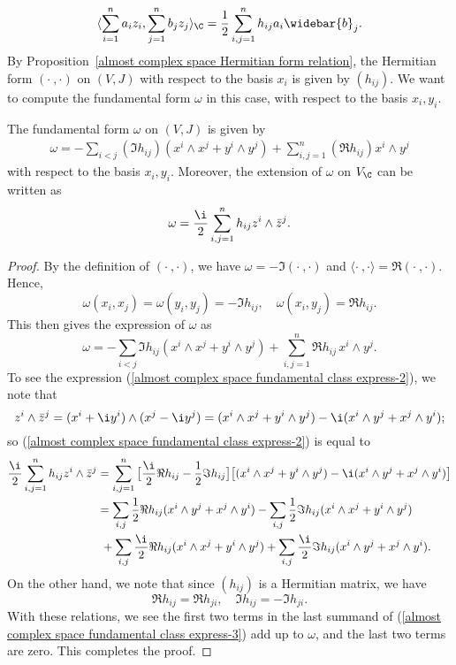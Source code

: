 \[\langle\sum_{i=1}^{n}a_iz_i,\sum_{j=1}^{n}b_jz_j\rangle_{\C}=\frac{1}{2}\sum_{i,j=1}^{n}h_{ij}a_i\widebar{b}_j.\]
By Proposition~\ref{almost complex space Hermitian form relation}, the Hermitian form $(\cdot\ ,\cdot)$ on $(V,J)$ with respect to the basis $x_i$ is given by $(h_{ij})$. We want to compute the fundamental form $\omega$ in this case, with respect to the basis $x_i,y_i$.
\begin{proposition}\label{almost complex space fundamental class express}
The fundamental form $\omega$ on $(V,J)$ is given by
\begin{align}\label{almost complex space fundamental class express-1}
\omega=-\sum_{i<j}(\Im h_{ij})(x^i\wedge x^j+y^i\wedge y^j)+\sum_{i,j=1}^{n}(\Re h_{ij})x^i\wedge y^j
\end{align}
with respect to the basis $x_i,y_i$. Moreover, the extension of $\omega$ on $V_{\C}$ can be written as
\begin{align}\label{almost complex space fundamental class express-2}
\omega=\frac{\i}{2}\sum_{i,j=1}^{n}h_{ij}z^i\wedge\bar{z}^j.
\end{align}
\end{proposition}
\begin{proof}
By the definition of $(\cdot\ ,\cdot)$, we have $\omega=-\Im(\cdot\ ,\cdot)$ and $\langle\cdot\ ,\cdot\rangle=\Re(\cdot\ ,\cdot)$. Hence,
\[\omega(x_i,x_j)=\omega(y_i,y_j)=-\Im h_{ij},\quad \omega(x_i,y_j)=\Re h_{ij}.\]
This then gives the expression of $\omega$ as
\[\omega=-\sum_{i<j}\Im h_{ij}(x^i\wedge x^j+y^i\wedge y^j)+\sum_{i,j=1}^{n}\Re h_{ij}\,x^i\wedge y^j.\]
To see the expression (\ref{almost complex space fundamental class express-2}), we note that
\[z^i\wedge\bar{z}^j=(x^i+\i y^i)\wedge(x^j-\i y^j)=(x^i\wedge x^j+y^i\wedge y^j)-\i(x^i\wedge y^j+x^j\wedge y^i);\]
so (\ref{almost complex space fundamental class express-2}) is equal to
\begin{equation}\label{almost complex space fundamental class express-3}
\begin{aligned}
\frac{\i}{2}\sum_{i,j=1}^{n}h_{ij}z^i\wedge\bar{z}^j&=\sum_{i,j=1}^{n}\big[\frac{\i}{2}\Re h_{ij}-\frac{1}{2}\Im h_{ij}\big]\big[(x^i\wedge x^j+y^i\wedge y^j)-\i(x^i\wedge y^j+x^j\wedge y^i)\big]\\
&=\sum_{i,j}\frac{1}{2}\Re h_{ij}(x^i\wedge y^j+x^j\wedge y^i)-\sum_{i,j}\frac{1}{2}\Im h_{ij}(x^i\wedge x^j+y^i\wedge y^j)\\
&\ +\sum_{i,j}\frac{\i}{2}\Re h_{ij}(x^i\wedge x^j+y^i\wedge y^j)+\sum_{i,j}\frac{\i}{2}\Im h_{ij}(x^i\wedge y^j+x^j\wedge y^i).
\end{aligned}
\end{equation}
On the other hand, we note that since $(h_{ij})$ is a Hermitian matrix, we have
\[\Re h_{ij}=\Re h_{ji},\quad \Im h_{ij}=-\Im h_{ji}.\]
With these relations, we see the first two terms in the last summand of (\ref{almost complex space fundamental class express-3}) add up to $\omega$, and the last two terms are zero. This completes the proof.
\end{proof}
